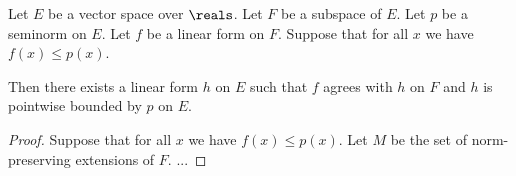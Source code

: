 %
%


\begin{theorem}
  Let $E$ be a vector space over $\reals$.
  Let $F$ be a subspace of $E$.
  Let $p$ be a seminorm on $E$.
  Let $f$ be a linear form on $F$.
  Suppose that for all $x$ we have $f(x) ≤ p(x)$.

  Then there exists a linear form $h$ on $E$
  such that $f$ agrees with $h$ on $F$
  and $h$ is pointwise bounded by $p$ on $E$.
\end{theorem}


\begin{proof}
  Suppose that for all $x$ we have $f(x) ≤ p(x)$.
  Let $M$ be the set of norm-preserving extensions of $F$.
  ...
\end{proof}
